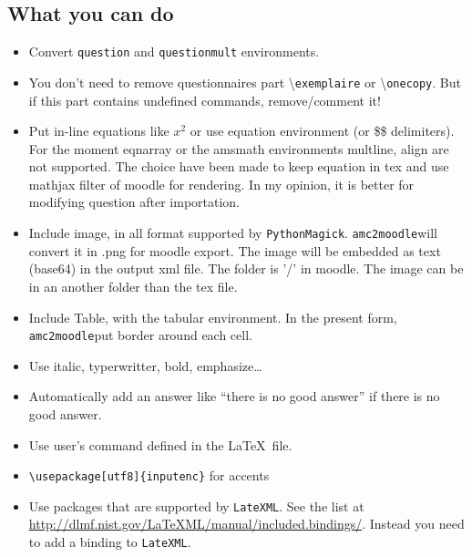 \documentclass[a4paper]{article}
\newcommand{\amc}{\texttt{amc2moodle}}
\begin{document}
\subsection{What you can do}
\begin{itemize}
\item Convert \texttt{question} and \texttt{questionmult} environments.
\item You don't need to remove questionnaires part \textbackslash \texttt{exemplaire} or \textbackslash \texttt{onecopy}. But if this part contains undefined commands, remove/comment it!
\item Put in-line equations like $x^2$ or use equation environment (or \$\$ delimiters). For the moment eqnarray  or the amsmath environments multline, align are not supported. The choice have been made to keep equation in tex and use mathjax filter of moodle for rendering. In my opinion, it is better for modifying question after importation.
\item Include image, in all format supported by \texttt{PythonMagick}. \amc   will convert it in .png for moodle export. The image will be embedded as text (base64) in the output xml file. The folder is '/' in moodle. The image can be in an another folder than the tex file.
\item Include Table, with the tabular environment. In the present form, \amc put  border around each cell.
\item Use italic, typerwritter, bold, emphasize\dots
\item Automatically add an answer like ``there is no good answer'' if there is no good answer.
\item Use user's command defined in the \LaTeX~file.
\item \texttt{\textbackslash usepackage[utf8]\{inputenc\}}   for accents
\item Use packages that are supported by \texttt{LateXML}. See the list at \url{http://dlmf.nist.gov/LaTeXML/manual/included.bindings/}. Instead you need to add a binding to \texttt{LateXML}.
\end{itemize}
\end{document}
